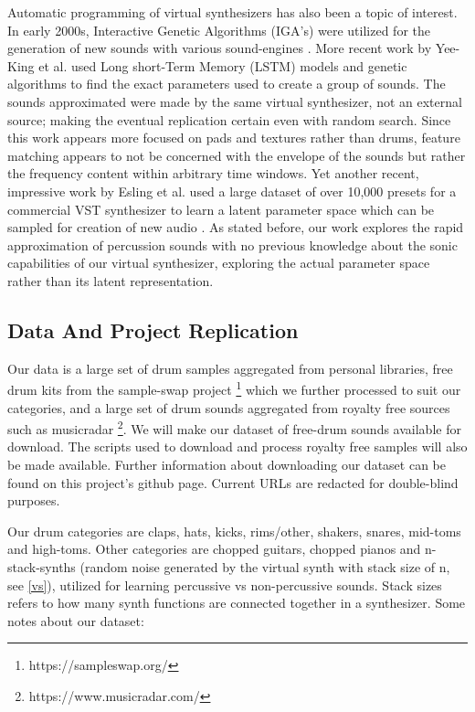 \documentclass{nime-alternate} %
\begin{document}
Automatic programming of virtual synthesizers has also been a topic of interest. In early 2000s, Interactive Genetic Algorithms (IGA's) were utilized for the generation of new sounds with various sound-engines \cite{johnson1999exploring,dahlstedt2001creating}. More recent work by Yee-King et al. \cite{yee2018automatic} used Long short-Term Memory (LSTM) models and genetic algorithms to find the exact parameters used to create a group of sounds. The sounds approximated were made by the same virtual synthesizer, not an external source; making the eventual replication certain even with random search. Since this work appears more focused on pads and textures rather than drums, feature matching appears to not be concerned with the envelope of the sounds but rather the frequency content within arbitrary time windows. Yet another recent, impressive work by Esling et al. used a large dataset of over 10,000 presets for a commercial VST synthesizer to learn a latent parameter space which can be sampled for creation of new audio \cite{esling2019universal}. As stated before, our work explores the rapid approximation of percussion sounds with no previous knowledge about the sonic capabilities of our virtual synthesizer, exploring the actual parameter space rather than its latent representation. 


\subsection{Data And Project Replication}
\label{data}
Our data is a large set of drum samples aggregated from personal libraries, free drum kits from the sample-swap project \footnote{https://sampleswap.org/} which we further processed to suit our categories, and a large set of drum sounds aggregated from royalty free sources such as musicradar \footnote{https://www.musicradar.com/}. We will make our dataset of free-drum sounds available for download. The scripts used to download and process royalty free samples will also be made available. Further information about downloading our dataset can be found on this project's github page. Current URLs are redacted for double-blind purposes.

Our drum categories are claps, hats, kicks, rims/other, shakers, snares, mid-toms and high-toms. Other categories are chopped guitars, chopped pianos and n-stack-synths (random noise generated by the virtual synth with stack size of n, see \ref{vs}), utilized for learning percussive vs non-percussive sounds. Stack sizes refers to how many synth functions are connected together in a synthesizer.
Some notes about our dataset:
\end{document}
